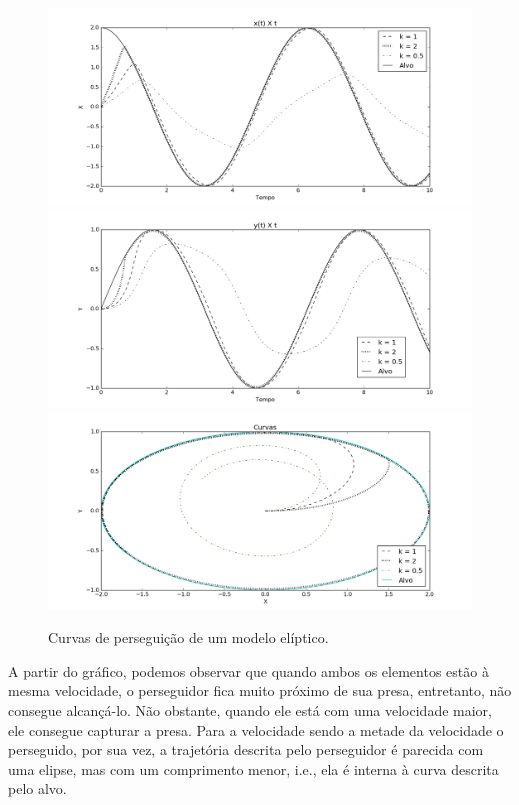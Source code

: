 \documentclass[a4paper,10pt]{article}
\begin{document}
  \begin{figure}[H]
   \includegraphics[width=\textwidth]{el-0-X.png}
   \includegraphics[width=\textwidth]{el-0-Y.png}
   \includegraphics[width=\textwidth]{el-0-XY.png}
   \label{fig:curva-el}
   \caption{Curvas de perseguição de um modelo elíptico.}
  \end{figure}
  
  A partir do gráfico, podemos observar que quando ambos os elementos estão à mesma velocidade, o perseguidor fica muito próximo de sua presa, entretanto, não consegue alcançá-lo. Não obstante, quando ele está com uma velocidade maior, ele consegue capturar a presa. Para a velocidade sendo a metade da velocidade o perseguido, por sua vez, a trajetória descrita pelo perseguidor é parecida com uma elipse, mas com um comprimento menor, i.e., ela é interna à curva descrita pelo alvo.
  
\end{document}
